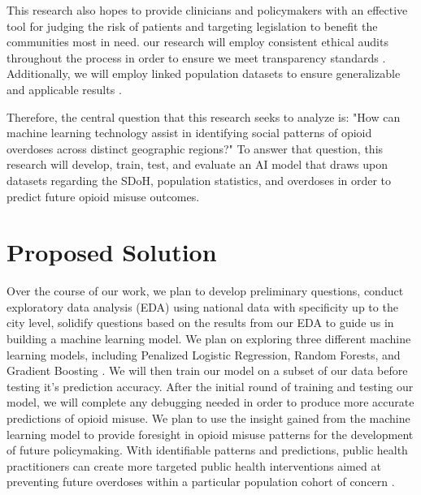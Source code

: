 \documentclass[journal]{IEEEtran}
\begin{document}
	This research also hopes to provide clinicians and policymakers with an effective tool for judging the risk of patients and targeting legislation to benefit the communities most in need. our research will employ consistent ethical audits throughout the process in order to ensure we meet transparency standards \cite{gabrielReviewLeveragingArtificial2025, bharatBigDataPredictive2021, centerfordevicesandradiologicalhealthTransparencyMachineLearningEnabled2024}. Additionally, we will employ linked population datasets to ensure generalizable and applicable results \cite{allenOpportunitiesOpioidOverdose2022}.

	Therefore, the central question that this research seeks to analyze is: "How can machine learning technology assist in identifying social patterns of opioid overdoses across distinct geographic regions?" To answer that question, this research will develop, train, test, and evaluate an AI model that draws upon datasets regarding the SDoH, population statistics, and overdoses in order to predict future opioid misuse outcomes.

	\section{Proposed Solution}

	Over the course of our work, we plan to develop preliminary questions, conduct exploratory data analysis (EDA) using national data with specificity up to the city level, solidify questions based on the results from our EDA to guide us in building a machine learning model. We plan on exploring three different machine learning models, including Penalized Logistic Regression, Random Forests, and Gradient Boosting \cite{partonMachineLearningApproach2026}. We will then train our model on a subset of our data before testing it's prediction accuracy. After the initial round of training and testing our model, we will complete any debugging needed in order to produce more accurate predictions of opioid misuse. We plan to use the insight gained from the machine learning model to provide foresight in opioid misuse patterns for the development of future policymaking. With identifiable patterns and predictions, public health practitioners can create more targeted public health interventions aimed at preventing future overdoses within a particular population cohort of concern \cite{blancoDataNeedsModels2022}.
\end{document}

